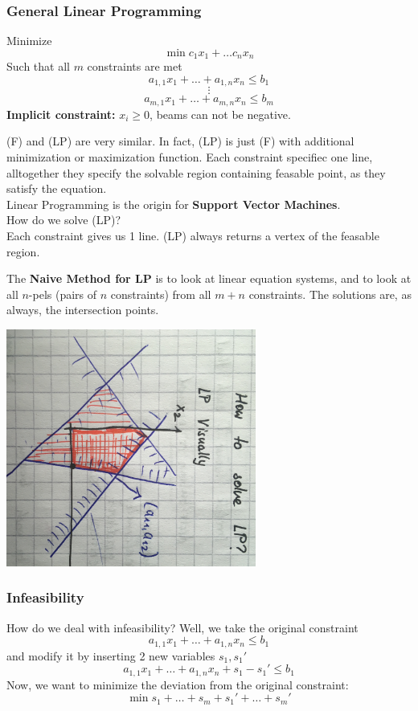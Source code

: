 \documentclass{exerciseBlue}
\begin{document}
\subsubsection{General Linear Programming}
Minimize
$$\min c_1x_1 + \dots c_nx_n$$
Such that all $m$ constraints are met
$$a_{1,1}x_1 + \dots + a_{1,n}x_n \leq b_1$$
$$\vdots$$
$$a_{m,1}x_1 + \dots + a_{m,n}x_n \leq b_m$$
\textbf{Implicit constraint:} $x_i \geq 0$, beams can not be negative.
\par
(F) and (LP) are very similar. In fact, (LP) is just (F) with additional minimization or maximization function. Each constraint specifiec one line, alltogether they specify the solvable region containing feasable point, as they satisfy the equation.\\
Linear Programming is the origin for \textbf{Support Vector Machines}.\\ How do we solve (LP)?\\
Each constraint gives us 1 line. (LP) always returns a vertex of the feasable region.
\par The \textbf{Naive Method for LP} is to look at linear equation systems, and to look at all $n$-pels (pairs of $n$ constraints) from all $m+n$ constraints. The solutions are, as always, the intersection points.
\begin{center}
	\includegraphics[height = 7.8cm]{Images/HowToSolveLP}
\end{center}
\subsubsection{Infeasibility}
How do we deal with infeasibility? Well, we take the original constraint
$$a_{1,1}x_1 + \dots + a_{1,n}x_n \leq b_1$$
and modify it by inserting 2 new variables $s_1,s_1'$
$$a_{1,1}x_1 + \dots + a_{1,n}x_n+s_1-s_1' \leq b_1$$
Now, we want to minimize the deviation from the original constraint:\\
$$\min s_1+\dots + s_m + s_1' + \dots + s_m'$$
\newpage
\end{document}
